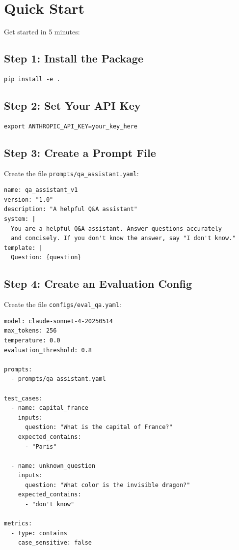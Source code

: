 \documentclass[11pt,a4paper]{report}
\begin{document}
\chapter{Quick Start}

Get started in 5 minutes:

\section{Step 1: Install the Package}

\begin{lstlisting}[style=bash]
pip install -e .
\end{lstlisting}

\section{Step 2: Set Your API Key}

\begin{lstlisting}[style=bash]
export ANTHROPIC_API_KEY=your_key_here
\end{lstlisting}

\section{Step 3: Create a Prompt File}

Create the file \texttt{prompts/qa\_assistant.yaml}:

\begin{lstlisting}[style=yaml]
name: qa_assistant_v1
version: "1.0"
description: "A helpful Q&A assistant"
system: |
  You are a helpful Q&A assistant. Answer questions accurately
  and concisely. If you don't know the answer, say "I don't know."
template: |
  Question: {question}
\end{lstlisting}

\section{Step 4: Create an Evaluation Config}

Create the file \texttt{configs/eval\_qa.yaml}:

\begin{lstlisting}[style=yaml]
model: claude-sonnet-4-20250514
max_tokens: 256
temperature: 0.0
evaluation_threshold: 0.8

prompts:
  - prompts/qa_assistant.yaml

test_cases:
  - name: capital_france
    inputs:
      question: "What is the capital of France?"
    expected_contains:
      - "Paris"

  - name: unknown_question
    inputs:
      question: "What color is the invisible dragon?"
    expected_contains:
      - "don't know"

metrics:
  - type: contains
    case_sensitive: false
\end{lstlisting}
\end{document}
